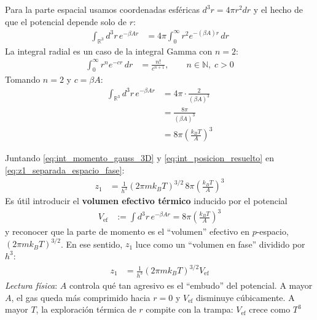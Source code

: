 \documentclass{article}
\begin{document}
Para la parte espacial usamos coordenadas esféricas $d^3r=4\pi r^2 dr$ y el hecho de que el potencial depende solo de $r$:
\begin{equation}
\begin{split}
\int_{\mathbb{R}^3} d^3r\,e^{-\beta A r}
&= 4\pi\int_{0}^{\infty} r^2 e^{-(\beta A) r}\,dr
\end{split}\label{eq:int_posicion_previa_gamma}
\end{equation}
La integral radial es un caso de la integral Gamma con $n=2$:
\begin{equation}
\begin{split}
\int_{0}^{\infty} r^n e^{-c r}\,dr
&= \frac{n!}{c^{n+1}},\qquad n\in\mathbb{N},\;c>0
\end{split}\label{eq:gamma_tabla}
\end{equation}
Tomando $n=2$ y $c=\beta A$:
\begin{equation}
\begin{split}
\int_{\mathbb{R}^3} d^3r\,e^{-\beta A r}
&= 4\pi\cdot \frac{2}{(\beta A)^3}\\
&= \frac{8\pi}{(\beta A)^3}\\
&= 8\pi\left(\frac{k_B T}{A}\right)^3
\end{split}\label{eq:int_posicion_resuelto}
\end{equation}



Juntando \eqref{eq:int_momento_gauss_3D} y \eqref{eq:int_posicion_resuelto} en \eqref{eq:z1_separada_espacio_fase}:
\begin{equation}
\begin{split}
z_1
&= \frac{1}{h^3}\left(2\pi m k_B T\right)^{3/2}\,8\pi\left(\frac{k_B T}{A}\right)^3
\end{split}\label{eq:z1_final_compacto}
\end{equation}
Es útil introducir el \textbf{volumen efectivo térmico} inducido por el potencial
\begin{equation}
\begin{split}
V_{\text{ef}}
&:= \int d^3r\,e^{-\beta A r} 
= 8\pi\left(\frac{k_B T}{A}\right)^3
\end{split}\label{eq:Vef_def}
\end{equation}
y reconocer que la parte de momento es el “volumen” efectivo en $p$-espacio, $(2\pi m k_B T)^{3/2}$. En ese sentido, $z_1$ luce como un “volumen en fase” dividido por $h^3$:
\begin{equation}
\begin{split}
z_1
&= \frac{1}{h^3}\left(2\pi m k_B T\right)^{3/2} V_{\text{ef}}
\end{split}\label{eq:z1_forma_volumen_ef}
\end{equation}
\textit{Lectura física}: $A$ controla qué tan agresivo es el “embudo” del potencial. A mayor $A$, el gas queda más comprimido hacia $r=0$ y $V_{\text{ef}}$ disminuye cúbicamente. A mayor $T$, la exploración térmica de $r$ compite con la trampa: $V_{\text{ef}}$ crece como $T^3$
\end{document}

